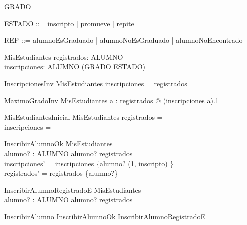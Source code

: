 \begin{zed}
    [ALUMNO]
\end{zed}
\begin{zed}
    GRADO == \nat
\end{zed}
\begin{zed}
    ESTADO ::= inscripto | promueve | repite
\end{zed}
\begin{zed}
    REP ::= alumnoEsGraduado | alumnoNoEsGraduado | alumnoNoEncontrado
\end{zed}

\begin{schema}{MisEstudiantes}
    registrados: \power ALUMNO \\
    inscripciones: ALUMNO \pfun (GRADO \cross ESTADO)
\end{schema}

\begin{schema}{InscripcionesInv}
    MisEstudiantes
    \where
    \dom inscripciones = registrados
\end{schema}

\begin{schema}{MaximoGradoInv}
    MisEstudiantes
    \where
    \forall a : registrados @ (inscripciones a).1 
\end{schema}

\begin{schema}{MisEstudiantesInicial}
    MisEstudiantes
    \where
    registrados = \emptyset \\
    inscripciones = \emptyset
\end{schema}

\begin{schema}{InscribirAlumnoOk}
    \Delta MisEstudiantes \\
    alumno? : ALUMNO
    \where
    alumno? \notin registrados \\
    inscripciones' = inscripciones \cup \{alumno? \mapsto (1, inscripto) \} \\
    registrados' = registrados \cup \{alumno?\}
\end{schema}

\begin{schema}{InscribirAlumnoRegistradoE}
    \Xi MisEstudiantes \\
    alumno? : ALUMNO
    \where
    alumno? \in registrados
\end{schema}

\begin{zed}
    InscribirAlumno  InscribirAlumnoOk \lor InscribirAlumnoRegistradoE
\end{zed}

